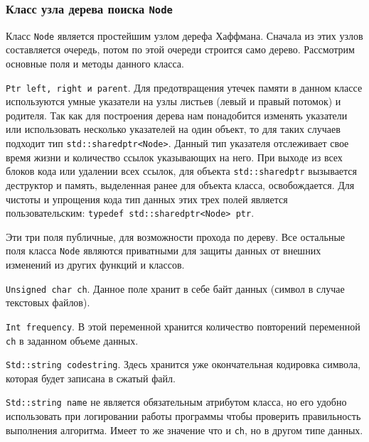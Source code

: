 \subsubsection{Класс узла дерева поиска \texttt{Node}}


Класс \texttt{Node} является простейшим узлом дерефа Хаффмана.
Сначала из этих узлов составляется очередь, потом по этой очереди строится само дерево.
Рассмотрим основные поля и методы данного класса.



\texttt{Ptr left, right и parent}.
Для предотвращения утечек памяти в данном классе используются умные указатели на узлы листьев (левый и правый потомок) и родителя.
Так как для построения дерева нам понадобится изменять указатели или использовать несколько указателей на один объект, то для таких случаев подходит тип \texttt{std::shared{\textunderscore}ptr<Node>}.
Данный тип указателя отслеживает свое время жизни и количество ссылок указывающих на него.
При выходе из всех блоков кода или удалении всех ссылок, для объекта \texttt{std::shared{\textunderscore}ptr}\cite{cpp} вызывается деструктор и память, выделенная ранее для объекта класса, освобождается.
Для чистоты и упрощения кода тип данных этих трех полей является пользовательским: \texttt{typedef std::shared{\textunderscore}ptr<Node> ptr}.



Эти три поля публичные, для возможности прохода по дереву.
Все остальные поля класса \texttt{Node} являются приватными\cite{lucik} для защиты данных от внешних изменений из других функций и классов.



\texttt{Unsigned char ch}. 
Данное поле хранит в себе байт данных (символ в случае текстовых файлов).



\texttt{Int frequency}.
В этой переменной хранится количество повторений переменной \texttt{ch} в заданном объеме данных.



\texttt{Std::string code{\textunderscore}string}. 
Здесь хранится уже окончательная кодировка символа, которая будет записана в сжатый файл.



\texttt{Std::string name} не является обязательным атрибутом класса, но его удобно использовать при логировании работы программы чтобы проверить правильность выполнения алгоритма.
Имеет то же значение что и \texttt{ch}, но в другом типе данных.



